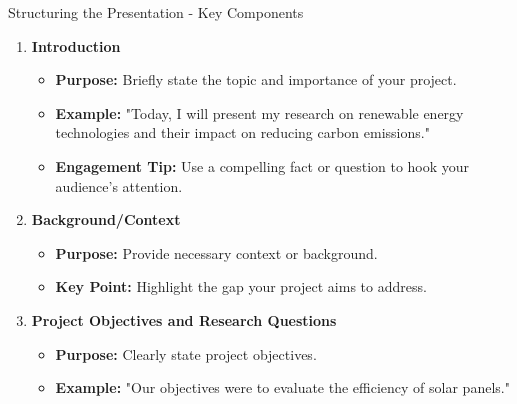 \documentclass[aspectratio=169]{beamer}
\begin{document}
\begin{frame}[fragile]{Structuring the Presentation - Key Components}
    \begin{enumerate}
        \item \textbf{Introduction}
        \begin{itemize}
            \item \textbf{Purpose:} Briefly state the topic and importance of your project.
            \item \textbf{Example:} "Today, I will present my research on renewable energy technologies and their impact on reducing carbon emissions."
            \item \textbf{Engagement Tip:} Use a compelling fact or question to hook your audience’s attention.
        \end{itemize}
        
        \item \textbf{Background/Context}
        \begin{itemize}
            \item \textbf{Purpose:} Provide necessary context or background.
            \item \textbf{Key Point:} Highlight the gap your project aims to address.
        \end{itemize}
        
        \item \textbf{Project Objectives and Research Questions}
        \begin{itemize}
            \item \textbf{Purpose:} Clearly state project objectives.
            \item \textbf{Example:} "Our objectives were to evaluate the efficiency of solar panels."
        \end{itemize}
    \end{enumerate}
\end{frame}
\end{document}
